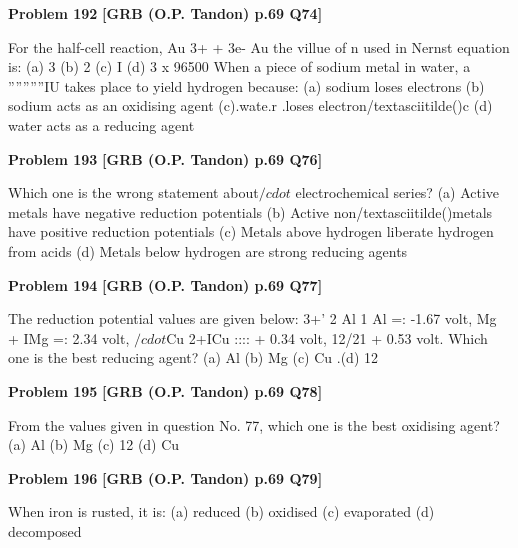 \begin{problembox}
\textbf{Problem 192} \hfill \textbf{[GRB (O.P. Tandon) p.69 Q74]}
\label{q:ext-grb_all_questions-192}

For the half-cell reaction, 
Au 3+ + 3e-
Au 
the villue of n used in Nernst equation is: 
(a) 3 
(b) 2 
(c) I 
(d) 3 x 96500 
When a piece of sodium metal 
in water, a ''''''''''IU 
takes place to yield hydrogen because: 
(a) sodium loses electrons 
(b) sodium acts as an oxidising agent 
(c).\underline{\hspace{1cm}}wate.r .loses electron/textasciitilde()c 
(d) water acts as a reducing agent
\end{problembox}

\begin{problembox}
\textbf{Problem 193} \hfill \textbf{[GRB (O.P. Tandon) p.69 Q76]}
\label{q:ext-grb_all_questions-193}

Which one is the wrong statement about$/cdot$ electrochemical 
series? 
(a) Active metals have negative reduction potentials 
(b) Active non/textasciitilde()metals have positive reduction potentials 
(c) Metals above hydrogen liberate hydrogen from acids 
(d) Metals below hydrogen are strong reducing agents
\end{problembox}

\begin{problembox}
\textbf{Problem 194} \hfill \textbf{[GRB (O.P. Tandon) p.69 Q77]}
\label{q:ext-grb_all_questions-194}

The reduction potential values are given below: 
3+' 
2 
Al 1 Al =: -1.67 volt, 
Mg + IMg =: 
2.34 volt, 
$/cdot$Cu 2+ICu :::: + 0.34 volt, 
12/21 
+ 0.53 volt. 
Which one is the best reducing agent? 
(a) Al 
(b) Mg 
(c) Cu 
.(d) 12
\end{problembox}

\begin{problembox}
\textbf{Problem 195} \hfill \textbf{[GRB (O.P. Tandon) p.69 Q78]}
\label{q:ext-grb_all_questions-195}

From the values given in question No. 77, which one is the 
best oxidising agent? 
(a) Al 
(b) Mg 
(c) 12 
(d) Cu
\end{problembox}

\begin{problembox}
\textbf{Problem 196} \hfill \textbf{[GRB (O.P. Tandon) p.69 Q79]}
\label{q:ext-grb_all_questions-196}

When iron is rusted, it is: 
(a) reduced 
(b) oxidised 
(c) evaporated 
(d) decomposed
\end{problembox}

